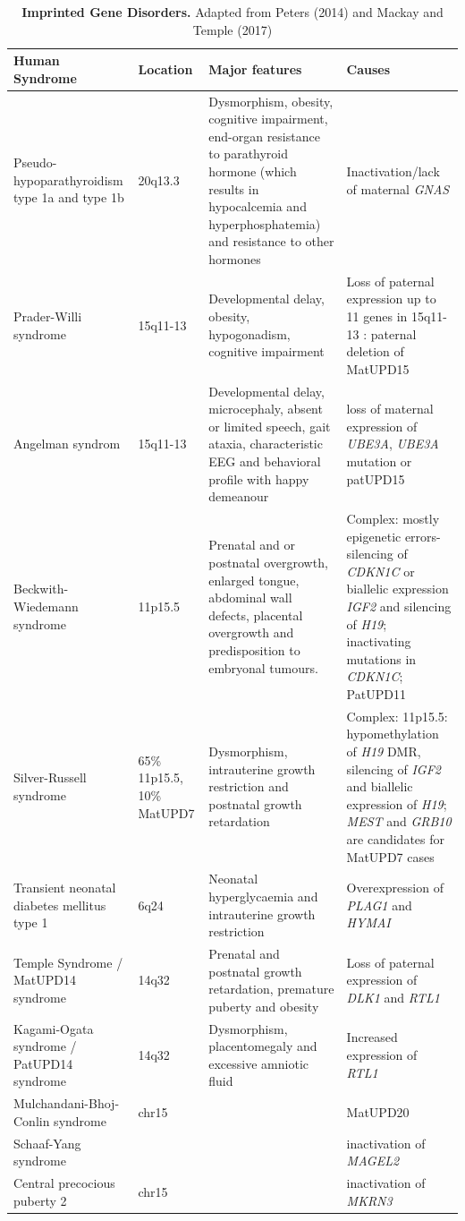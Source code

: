 \begin{table}
\centering
\begin{tabular}{@{}llll@{}}
\toprule Human Syndrome & Location & Major features & Causes \\ \midrule 
Pseudo-hypoparathyroidism type 1a and type 1b  & 20q13.3 & Dysmorphism, obesity, cognitive impairment, end-organ resistance to parathyroid hormone (which results in hypocalcemia and hyperphosphatemia) and resistance to other hormones & Inactivation/lack of maternal \emph{GNAS} \\ 
Prader-Willi syndrome & 15q11-13 & Developmental delay, obesity, hypogonadism, cognitive impairment & Loss of paternal expression up to 11 genes in 15q11-13 : paternal deletion of MatUPD15\\  
Angelman syndrom & 15q11-13 & Developmental delay, microcephaly, absent or limited speech, gait ataxia, characteristic EEG and behavioral profile with happy demeanour & loss of maternal expression of \emph{UBE3A}, \emph{UBE3A} mutation or patUPD15\\
Beckwith-Wiedemann syndrome & 11p15.5 & Prenatal and or postnatal overgrowth, enlarged tongue, abdominal wall defects, placental overgrowth and predisposition to embryonal tumours. & Complex: mostly epigenetic errors- silencing of \emph{CDKN1C} or biallelic expression \emph{IGF2} and silencing of \emph{H19}; inactivating mutations in \emph{CDKN1C}; PatUPD11\\
Silver-Russell syndrome & 65\% 11p15.5, 10\% MatUPD7 & Dysmorphism, intrauterine growth restriction and postnatal growth retardation & Complex: 11p15.5: hypomethylation of \emph{H19} DMR, silencing of \emph{IGF2} and biallelic expression of \emph{H19}; \emph{MEST} and \emph{GRB10} are candidates for MatUPD7 cases\\
Transient neonatal diabetes mellitus type 1 & 6q24& Neonatal hyperglycaemia and intrauterine growth restriction & Overexpression of \emph{PLAG1} and \emph{HYMAI}\\
Temple Syndrome / MatUPD14 syndrome & 14q32 & Prenatal and postnatal growth retardation, premature puberty and obesity & Loss of paternal expression of \emph{DLK1} and \emph{RTL1} \\
Kagami-Ogata syndrome / PatUPD14 syndrome & 14q32 & Dysmorphism, placentomegaly and excessive amniotic fluid & Increased expression of \emph{RTL1}\\
Mulchandani-Bhoj-Conlin syndrome & chr15 & & MatUPD20\\
Schaaf-Yang syndrome & & & inactivation of \emph{MAGEL2}\\
Central precocious puberty 2 & chr15 & & inactivation of \emph{MKRN3}\\

\bottomrule
\end{tabular}
\caption[Imprinted Gene Disorders.]{\textbf{Imprinted Gene Disorders.} Adapted from Peters (2014) and Mackay and Temple (2017) \cite{Peters2014,Mackay:2017kn}}
\label{tab:imprinteddisease}
\end{table}



